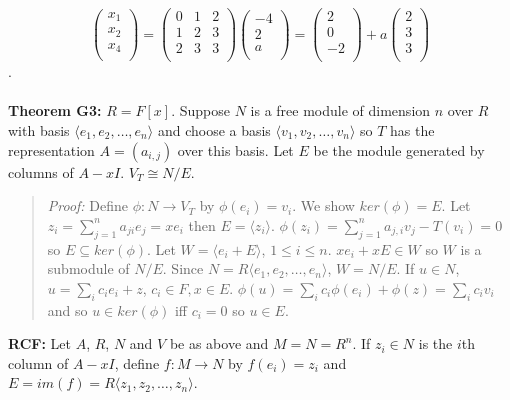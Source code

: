 $$
\left(
\begin{array}{c}
x_1\\
x_2\\
x_4\\
\end{array}
\right)
=
\left(
\begin{array}{ccc}
0 & 1 & 2\\
1 & 2& 3\\
2 & 3& 3\\
\end{array}
\right)
\left(
\begin{array}{c}
-4\\
2\\
a\\
\end{array}
\right) =
\left(
\begin{array}{c}
2\\
0\\
-2\\
\end{array}
\right) + a
\left(
\begin{array}{c}
2\\
3\\
3\\
\end{array}
\right)
$$.
\\
\\
{\bf Theorem G3:} $R=F[x]$.  Suppose $N$ is a free module of dimension $n$ over $R$ 
with basis $\langle e_1 , e_2 , \ldots , e_n \rangle$ and choose a
basis $\langle v_1 , v_2 , \ldots , v_n \rangle$ so $T$ has the representation $A= (a_{i,j})$
over this basis.  Let $E$ be the module generated by columns of $A-xI$.  $V_T \cong N/E$.
\begin{quote}
\emph{Proof:} 
Define $\phi: N \rightarrow V_T$ by $\phi(e_i)=v_i$.  
We show $ker(\phi)=E$. 
Let $z_i = \sum_{j=1}^n a_{ji}e_j =xe_i$ then $E= \langle z_i \rangle$.
$\phi(z_i) = \sum_{j=1}^n a_{j,i}v_j - T(v_i)= 0$ so $E \subseteq ker(\phi)$.
Let $W = \langle e_i + E \rangle$, $1 \leq i \leq n$.  $x e_i + xE \in W$ so $W$ is a submodule of $N/E$.
Since $N= R \langle e_1 , e_2 , \ldots , e_n \rangle$, $W= N/E$.
If $u \in N$, $u = \sum_i c_i e_i + z$, $c_i \in F, x \in E$.
$\phi(u)=  \sum_i c_i \phi(e_i) + \phi(z) = \sum_i c_i v_i$ and so $u \in ker(\phi)$ iff $c_i =0$ so $u \in E$.
\end{quote}
{\bf RCF:} Let $A$, $R$, $N$ and $V$ be as above and $M = N = R^n$.  If $z_i \in N$ is the $i$th column
of $A-xI$, define $f: M \rightarrow N$ by $f(e_i)= z_i$ and $E= im(f) = R \langle z_1, z_2, \ldots , z_n \rangle$.
